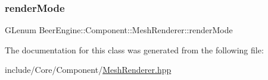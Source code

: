 \subsubsection{\texorpdfstring{render\+Mode}{renderMode}}
{\footnotesize\ttfamily G\+Lenum Beer\+Engine\+::\+Component\+::\+Mesh\+Renderer\+::render\+Mode}



The documentation for this class was generated from the following file\+:\begin{DoxyCompactItemize}
\item 
include/\+Core/\+Component/\mbox{\hyperlink{_mesh_renderer_8hpp}{Mesh\+Renderer.\+hpp}}\end{DoxyCompactItemize}
